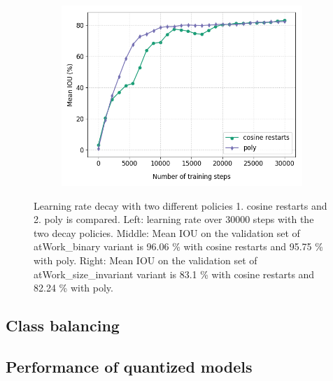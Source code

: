 \begin{figure}[!htb]
\begin{subfigure}{.3\textwidth}
		\end{subfigure}
		\begin{subfigure}{.3\textwidth}
			\centering
			\includegraphics[width=1\linewidth]{images/lr_size}
		\end{subfigure}
		\caption{Learning rate decay with two different policies 1. cosine restarts and 2. poly is compared. Left: learning rate over 30000 steps with the two decay policies. Middle: Mean IOU on the validation set of atWork\_binary variant is 96.06 \% with cosine restarts and 95.75 \% with poly. Right: Mean IOU on the validation set of atWork\_size\_invariant variant is 83.1 \% with cosine restarts and 82.24 \% with poly.}
		\label{Fig:lr}
	\end{figure}

\subsection{Class balancing}


\subsection{Performance of quantized models}

